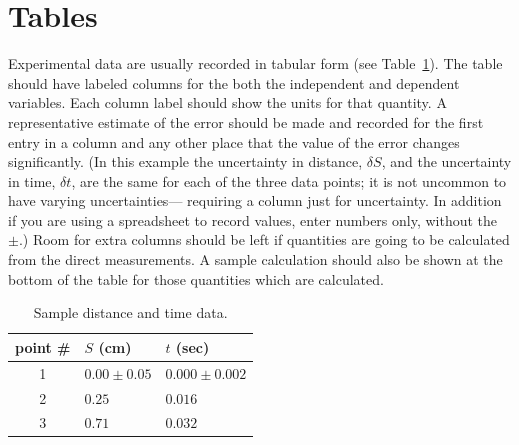 \newapp
\section*{Tables}
     Experimental data are usually recorded in tabular
form (see Table~\ref{tableb2}).  The table should have labeled columns for the
both the independent and dependent variables.  Each column label should show
the units for that quantity.  A representative estimate of the
error should be made and recorded for the first entry in a column
and any other place that the value of the error changes
significantly.  
(In this example the uncertainty in distance, $\delta S$,
and the uncertainty in time, $\delta t$, are the same for each
of the three data points; it is not uncommon to have varying uncertainties---
requiring a column just for uncertainty.  In addition if you are using a spreadsheet
to record values, enter numbers only, without the $\pm$.)
Room for extra columns should be left if
quantities are going to be calculated from the direct
measurements.  A sample calculation should also be shown at the
bottom of the table for those quantities which are calculated.
\begin{table}[h]
\begin{center}
\begin{tabular}{|cll|}
\hline
point \# & $S$ (cm) & $t$ (sec) \\ \hline
1 & $0.00 \pm 0.05$ & $0.000 \pm 0.002$ \\
2 & $0.25$ & $0.016$ \\
3 & $0.71$ & $0.032$
\\ \hline
\end{tabular}
\end{center}
\caption{Sample distance and time data.  \label{tableb2}}
\end{table}

